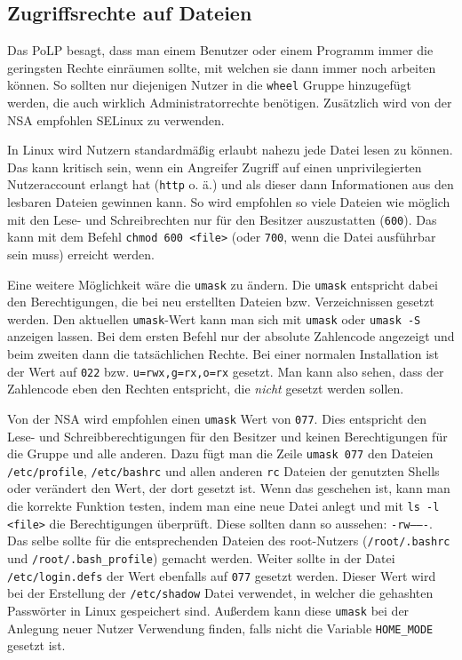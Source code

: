 \subsection{Zugriffsrechte auf Dateien}\label{sec:permissions}
Das \ac{PoLP} besagt, dass man einem Benutzer oder einem Programm immer die geringsten Rechte einräumen sollte, mit welchen sie dann immer noch arbeiten können. So sollten nur diejenigen Nutzer in die \texttt{wheel} Gruppe hinzugefügt werden, die auch wirklich Administratorrechte benötigen. Zusätzlich wird von der NSA empfohlen SELinux zu verwenden.\cite[S. 14]{GuideSecureConfiguration2011}

In Linux wird Nutzern standardmäßig erlaubt nahezu jede Datei lesen zu können. Das kann kritisch sein, wenn ein Angreifer Zugriff auf einen unprivilegierten Nutzeraccount erlangt hat {\small(\texttt{http} o. ä.)} und als dieser dann Informationen aus den lesbaren Dateien gewinnen kann. So wird empfohlen so viele Dateien wie möglich mit den Lese- und Schreibrechten nur für den Besitzer auszustatten {\small(\texttt{600})}.\cite{SecurityArchWiki} Das kann mit dem Befehl \texttt{chmod 600 <file>} {\small(oder \texttt{700}, wenn die Datei ausführbar sein muss)} erreicht werden.

Eine weitere Möglichkeit wäre die \texttt{umask} zu ändern. Die \texttt{umask} entspricht dabei den Berechtigungen, die bei neu erstellten Dateien bzw. Verzeichnissen gesetzt werden. Den aktuellen \texttt{umask}-Wert kann man sich mit \texttt{umask} oder \texttt{umask -S} anzeigen lassen. Bei dem ersten Befehl nur der absolute Zahlencode angezeigt und beim zweiten dann die tatsächlichen Rechte. Bei einer normalen Installation ist der Wert auf \texttt{022} bzw. \texttt{u=rwx,g=rx,o=rx} gesetzt. Man kann also sehen, dass der Zahlencode eben den Rechten entspricht, die \emph{nicht} gesetzt werden sollen.

Von der NSA wird empfohlen einen \texttt{umask} Wert von \texttt{077}.\cite[S. 49]{GuideSecureConfiguration2011} Dies entspricht den Lese- und Schreibberechtigungen für den Besitzer und keinen Berechtigungen für die Gruppe und alle anderen. Dazu fügt man die Zeile \texttt{umask 077} den Dateien \texttt{/etc/profile}, \texttt{/etc/bashrc} und allen anderen \texttt{rc} Dateien der genutzten Shells oder verändert den Wert, der dort gesetzt ist. Wenn das geschehen ist, kann man die korrekte Funktion testen, indem man eine neue Datei anlegt und mit \texttt{ls -l <file>} die Berechtigungen überprüft. Diese sollten dann so aussehen: \texttt{-rw-------}. Das selbe sollte für die entsprechenden Dateien des root-Nutzers {\small(\texttt{/root/.bashrc} und \texttt{/root/.bash\_profile})} gemacht werden. Weiter sollte in der Datei \texttt{/etc/login.defs} der Wert ebenfalls auf \texttt{077} gesetzt werden.\cite[S. 49]{GuideSecureConfiguration2011} Dieser Wert wird bei der Erstellung der \texttt{/etc/shadow} Datei verwendet, in welcher die gehashten Passwörter in Linux gespeichert sind. Außerdem kann diese \texttt{umask} bei der Anlegung neuer Nutzer Verwendung finden, falls nicht die Variable \texttt{HOME\_MODE} gesetzt ist.


